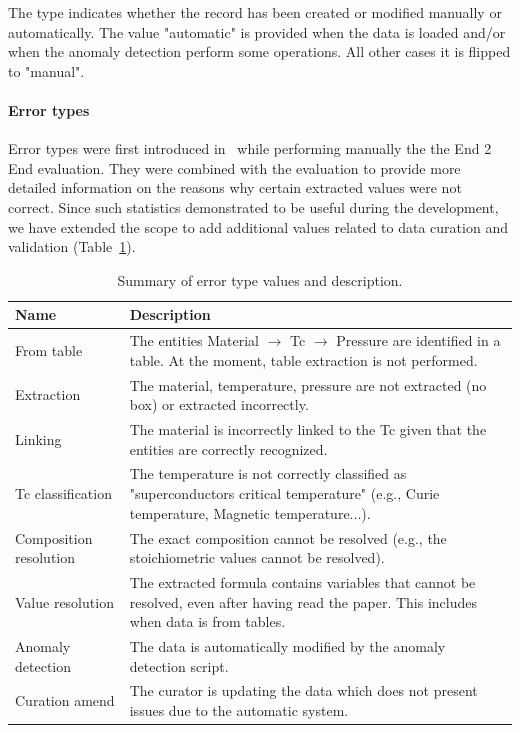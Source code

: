 \documentclass[a4paper]{article}
\begin{document}
The type indicates whether the record has been created or modified manually or automatically. The value "automatic" is provided when the data is loaded and/or when the anomaly detection perform some operations. All other cases it is flipped to "manual". 

\paragraph{Error types} Error types were first introduced in~\cite{lfoppiano2023automatic} while performing manually the the End 2 End evaluation. They were combined with the evaluation to provide more detailed information on the reasons why certain extracted values were not correct. 
Since such statistics demonstrated to be useful during the development, we have extended the scope to add additional values related to data curation and validation (Table~\ref{tab:error-types}).

\begin{table}[htbp]
\centering
\begin{tabular}{|p{4cm}|p{8cm}|}
\hline
\textbf{Name} & \textbf{Description} \\
\hline
From table & The entities Material $\rightarrow$ Tc $\rightarrow$ Pressure are identified in a table. At the moment, table extraction is not performed. \\
\hline
Extraction & The material, temperature, pressure are not extracted (no box) or extracted incorrectly. \\
\hline
Linking & The material is incorrectly linked to the Tc given that the entities are correctly recognized. \\
\hline
Tc classification & The temperature is not correctly classified as "superconductors critical temperature" (e.g., Curie temperature, Magnetic temperature...). \\
\hline
Composition resolution & The exact composition cannot be resolved (e.g., the stoichiometric values cannot be resolved). \\
\hline
Value resolution & The extracted formula contains variables that cannot be resolved, even after having read the paper. This includes when data is from tables. \\
\hline
Anomaly detection & The data is automatically modified by the anomaly detection script. \\
\hline
Curation amend & The curator is updating the data which does not present issues due to the automatic system. \\
\hline
\end{tabular}
\caption{Summary of error type values and description.}
\label{tab:error-types}
\end{table}
\end{document}

